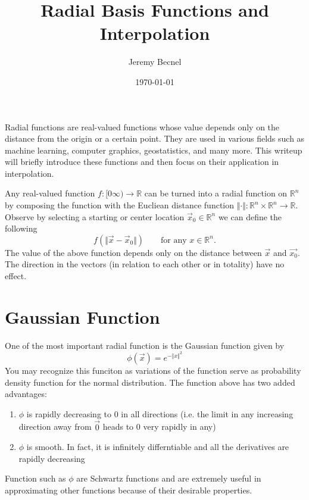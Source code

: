 \documentclass{article}
\title{Radial Basis Functions and Interpolation}
\author{Jeremy Becnel}
\date{\today}
\begin{document}
\maketitle
Radial  functions are real-valued functions whose value depends only on the distance 
from the origin or a certain point. 
They are used in various fields such as machine learning, 
computer graphics, geostatistics, and many more. 
This writeup will briefly introduce these functions and then focus on their application in interpolation.

Any real-valued function $f:[0\infty) \to \mathbb{R}$ can be turned into a radial function on $\mathbb{R}^n$
by composing the function with the Eucliean distance function $\Vert \cdot \Vert : \mathbb{R}^n \times \mathbb{R}^n \to \mathbb{R}$.
Observe by selecting a starting or center location $\vec{x}_0 \in \mathbb{R}^n$ we can define the following
\[
f(\Vert \vec{x} - \vec{x}_0 \Vert ) \qquad \text{for any $x \in \mathbb{R}^n$.}   
\]
The value of the above function depends only on the distance between $\vec{x}$ and $\vec{x_0}$. The direction in the vectors
(in relation to each other or in totality) have no effect. 


\section*{Gaussian Function}
One of the most important radial function is the Gaussian function given by 
\[
\phi(\vec{x}) = e^{-\Vert x \Vert^2}
\]
You may recognize this funciton as variations of the function serve as probability density function for the
normal distribution. 
The function above has two added advantages:
\begin{enumerate}
    \item $\phi$ is rapidly decreasing to 0 in all directions (i.e. the limit in any increasing direction away from $\vec{0}$ heads to 0 very rapidly in any)
    \item $\phi$ is smooth. In fact, it is infinitely differntiable and all the derivatives are rapidly decreasing
\end{enumerate}
Function such as $\phi$ are Schwartz functions and are extremely useful in approximating other functions because
of their desirable properties. 
\end{document}
